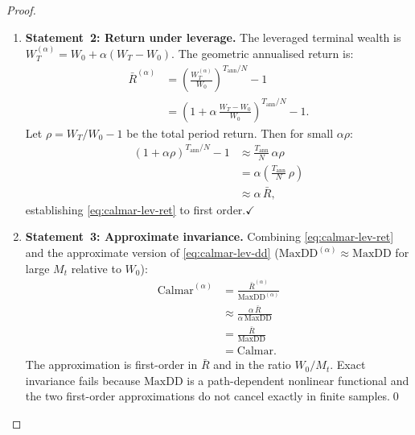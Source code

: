 \documentclass[12pt,openany]{book}
\newcommand{\MaxDD}{\mathrm{MaxDD}}
\numberwithin{equation}{chapter}
\theoremstyle{plain}
\theoremstyle{definition}
\theoremstyle{remark}
\numberwithin{equation}{chapter}
\theoremstyle{plain}
\begin{document}
\begin{proof}
\begin{enumerate}
  \item \textbf{Statement~2: Return under leverage.}
        The leveraged terminal wealth is
        $W^{(\alpha)}_T = W_0 + \alpha(W_T - W_0)$.
        The geometric annualised return is:
        \begin{align}
          \bar{R}^{(\alpha)}
            &= \left(\frac{W^{(\alpha)}_T}{W_0}\right)^{T_{\mathrm{ann}}/N}
               - 1
          \label{eq:calmar-lev-r1} \\
            &= \left(1 + \alpha\,\frac{W_T - W_0}{W_0}
               \right)^{T_{\mathrm{ann}}/N}
               - 1.
          \label{eq:calmar-lev-r2}
        \end{align}
        Let $\rho = W_T/W_0 - 1$ be the total period
        return.  Then for small $\alpha\rho$:
        \begin{align}
          (1 + \alpha\rho)^{T_{\mathrm{ann}}/N} - 1
            &\approx \frac{T_{\mathrm{ann}}}{N}\,\alpha\rho
          \label{eq:calmar-lev-r3} \\
            &= \alpha\left(\frac{T_{\mathrm{ann}}}{N}\,\rho\right)
          \label{eq:calmar-lev-r4} \\
            &\approx \alpha\,\bar{R},
          \label{eq:calmar-lev-r5}
        \end{align}
        establishing \eqref{eq:calmar-lev-ret} to first
        order.\hfill$\checkmark$

  \item \textbf{Statement~3: Approximate invariance.}
        Combining \eqref{eq:calmar-lev-ret} and the
        approximate version of \eqref{eq:calmar-lev-dd}
        ($\MaxDD^{(\alpha)} \approx \MaxDD$ for large $M_t$
        relative to $W_0$):
        \begin{align}
          \mathrm{Calmar}^{(\alpha)}
            &= \frac{\bar{R}^{(\alpha)}}{\MaxDD^{(\alpha)}}
          \label{eq:calmar-lev-c1} \\
            &\approx \frac{\alpha\,\bar{R}}{\alpha\,\MaxDD}
          \label{eq:calmar-lev-c2} \\
            &= \frac{\bar{R}}{\MaxDD}
          \label{eq:calmar-lev-c3} \\
            &= \mathrm{Calmar}.
          \label{eq:calmar-lev-c4}
        \end{align}
        The approximation is first-order in $\bar{R}$ and
        in the ratio $W_0/M_t$.  Exact invariance fails
        because $\MaxDD$ is a path-dependent nonlinear
        functional and the two first-order approximations
        do not cancel exactly in finite samples.\qed
\end{enumerate}
\end{proof}
\end{document}
